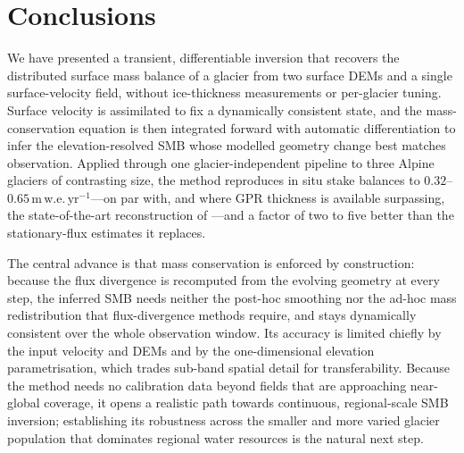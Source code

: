 \section{Conclusions}\label{sec:conclusions}

We have presented a transient, differentiable inversion that recovers the distributed
surface mass balance of a glacier from two surface DEMs and a single surface-velocity
field, without ice-thickness measurements or per-glacier tuning. Surface velocity is
assimilated to fix a dynamically consistent state, and the mass-conservation equation
is then integrated forward with automatic differentiation to infer the
elevation-resolved SMB whose modelled geometry change best matches observation.
Applied through one glacier-independent pipeline to three Alpine glaciers of
contrasting size, the method reproduces in situ stake balances to
$0.32$--$0.65\,\mathrm{m\,w.e.\,yr^{-1}}$---on par with, and where GPR thickness is
available surpassing, the state-of-the-art
reconstruction of \citet{kneib2024}---and
a factor of two to five better than the
stationary-flux estimates it replaces.

The central advance is that mass conservation is enforced by construction: because the
flux divergence is recomputed from the evolving geometry at every step, the inferred
SMB needs neither the post-hoc smoothing nor the ad-hoc mass redistribution that
flux-divergence methods require, and stays dynamically consistent over the whole
observation window. Its accuracy is limited chiefly by the input velocity and DEMs and
by the one-dimensional elevation parametrisation, which trades sub-band spatial detail
for transferability. Because the method needs no calibration data beyond fields that
are approaching near-global coverage, it opens a realistic path towards continuous,
regional-scale SMB inversion; establishing its robustness across the smaller and more
varied glacier population that dominates regional water resources is the natural next
step.
